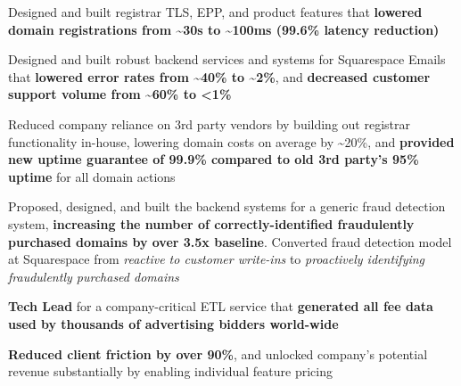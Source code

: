 \documentclass[]{two-column-resume}
\begin{document}
\begin{minipage}[t]{0.65\textwidth}
\begin{tightemize}
                            \item Designed and built registrar TLS, EPP, and product features that \textbf{lowered domain registrations from \textasciitilde30s to \textasciitilde100ms (99.6\% latency reduction)}
                            \item Designed and built robust backend services and systems for Squarespace Emails that \textbf{lowered error rates from \textasciitilde40\% to \textasciitilde2\%}, and \textbf{decreased customer support volume from \textasciitilde60\% to <1\%}
                            \item Reduced company reliance on 3rd party vendors by building out registrar functionality in-house, lowering domain costs on average by \textasciitilde20\%, and \textbf{provided new uptime guarantee of 99.9\% compared to old 3rd party's 95\% uptime} for all domain actions
                            \item Proposed, designed, and built the backend systems for a generic fraud detection system, \textbf{increasing the number of correctly-identified fraudulently purchased domains by over 3.5x baseline}. Converted fraud detection model at Squarespace from \textit{reactive to customer write-ins} to \textit{proactively identifying fraudulently purchased domains}
                    \end{tightemize}
        \sectionsep
        \vspace{\topsep} %
        \begin{tightemize}
                            \item \textbf{Tech Lead} for a company-critical ETL service that \textbf{generated all fee data used by thousands of advertising bidders world-wide}
                            \item \textbf{Reduced client friction by over 90\%}, and unlocked company's potential revenue substantially by enabling individual feature pricing
                    \end{tightemize}
        \sectionsep
    



\end{minipage}
\end{document}
